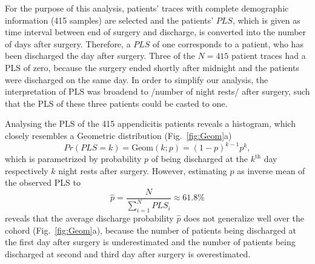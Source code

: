 For the purpose of this analysis, patients' traces with complete
demographic information (415 samples) are selected and
the patients' $PLS$, which is
given as time interval between end of surgery and discharge, is
converted into the number of days after surgery. Therefore, a $PLS$ of
one corresponds to a patient, who has been discharged the day after
surgery. Three of the $N=415$  %
patient traces had a PLS of zero, because the surgery ended shortly after midnight and the patients were discharged on the same day. In order to simplify our analysis, the interpretation of PLS was broadend to /number of night rests/ after surgery, such that the PLS of these three patients could be casted to one.

Analysing the PLS of the 415 appendicitis patients reveals a
histogram, which closely resembles a Geometric distribution (Fig.~\ref{fig:Geom}a)
\begin{equation}
Pr(PLS=k) = \text{Geom}(k; p) = (1-p)^{k-1}p^{k},
\end{equation}
which is parametrized by probability $p$ of being discharged at the $k^\text{th}$ day respectively $k$ night rests after surgery. 
However, estimating $p$ as inverse mean of the observed PLS to 
\begin{equation}
 \hat{p} = \frac{N}{\sum\limits_{i=1}^N PLS_i} \approx 61.8\%	
\end{equation}
reveals that the average discharge probability $\hat{p}$ does not
generalize well over the cohord (Fig.~\ref{fig:Geom}a), because the number of patients being discharged at the first day after surgery is underestimated and the number of patients being discharged at second and third day after surgery is overestimated.


